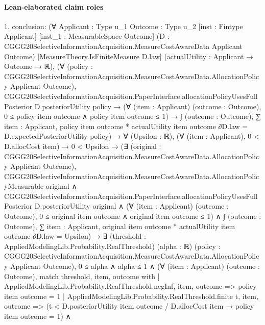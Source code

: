 \documentclass[10pt]{article}
\begin{document}
\paragraph{Lean-elaborated claim roles}\begin{ReviewVerbatim}
1. conclusion: (∀ {Applicant : Type u_1} {Outcome : Type u_2} [inst : Fintype Applicant] [inst_1 : MeasurableSpace Outcome]
    (D : CGGG20SelectiveInformationAcquisition.MeasureCostAwareData Applicant Outcome)
    [MeasureTheory.IsFiniteMeasure D.law] (actualUtility : Applicant → Outcome → ℝ),
    (∀ (policy : CGGG20SelectiveInformationAcquisition.MeasureCostAwareData.AllocationPolicy Applicant Outcome),
        CGGG20SelectiveInformationAcquisition.PaperInterface.allocationPolicyUsesFullPosterior D.posteriorUtility
            policy →
          (∀ (item : Applicant) (outcome : Outcome), 0 ≤ policy item outcome ∧ policy item outcome ≤ 1) →
            ∫ (outcome : Outcome), ∑ item : Applicant, policy item outcome * actualUtility item outcome ∂D.law =
              D.expectedPosteriorUtility policy) →
      ∀ (Upsilon : ℝ),
        (∀ (item : Applicant), 0 < D.allocCost item) →
          0 < Upsilon →
            (∃ (original :
                CGGG20SelectiveInformationAcquisition.MeasureCostAwareData.AllocationPolicy Applicant Outcome),
                CGGG20SelectiveInformationAcquisition.MeasureCostAwareData.AllocationPolicyMeasurable original ∧
                  CGGG20SelectiveInformationAcquisition.PaperInterface.allocationPolicyUsesFullPosterior
                      D.posteriorUtility original ∧
                    (∀ (item : Applicant) (outcome : Outcome), 0 ≤ original item outcome ∧ original item outcome ≤ 1) ∧
                      ∫ (outcome : Outcome),
                          ∑ item : Applicant, original item outcome * actualUtility item outcome ∂D.law =
                        Upsilon) →
              ∃ (threshold : AppliedModelingLib.Probability.RealThreshold) (alpha : ℝ) (policy :
                CGGG20SelectiveInformationAcquisition.MeasureCostAwareData.AllocationPolicy Applicant Outcome),
                0 ≤ alpha ∧
                  alpha ≤ 1 ∧
                    (∀ (item : Applicant) (outcome : Outcome),
                        match threshold, item, outcome with
                        | AppliedModelingLib.Probability.RealThreshold.negInf, item, outcome => policy item outcome = 1
                        | AppliedModelingLib.Probability.RealThreshold.finite t, item, outcome =>
                          (t < D.posteriorUtility item outcome / D.allocCost item → policy item outcome = 1) ∧

\end{ReviewVerbatim}
\end{document}
